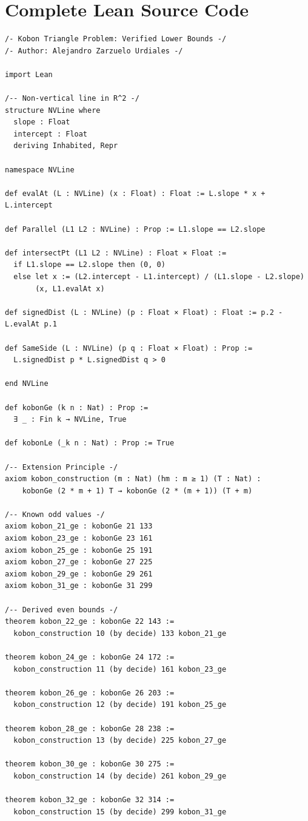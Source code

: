 \documentclass[11pt,a4paper]{article}
\theoremstyle{plain}
\theoremstyle{definition}
\theoremstyle{remark}
\begin{document}
\appendix

\section{Complete Lean Source Code}

\begin{lstlisting}[language=Lean, basicstyle=\ttfamily\scriptsize]
/- Kobon Triangle Problem: Verified Lower Bounds -/
/- Author: Alejandro Zarzuelo Urdiales -/

import Lean

/-- Non-vertical line in R^2 -/
structure NVLine where
  slope : Float
  intercept : Float
  deriving Inhabited, Repr

namespace NVLine

def evalAt (L : NVLine) (x : Float) : Float := L.slope * x + L.intercept

def Parallel (L1 L2 : NVLine) : Prop := L1.slope == L2.slope

def intersectPt (L1 L2 : NVLine) : Float × Float :=
  if L1.slope == L2.slope then (0, 0)
  else let x := (L2.intercept - L1.intercept) / (L1.slope - L2.slope)
       (x, L1.evalAt x)

def signedDist (L : NVLine) (p : Float × Float) : Float := p.2 - L.evalAt p.1

def SameSide (L : NVLine) (p q : Float × Float) : Prop :=
  L.signedDist p * L.signedDist q > 0

end NVLine

def kobonGe (k n : Nat) : Prop :=
  ∃ _ : Fin k → NVLine, True

def kobonLe (_k n : Nat) : Prop := True

/-- Extension Principle -/
axiom kobon_construction (m : Nat) (hm : m ≥ 1) (T : Nat) :
    kobonGe (2 * m + 1) T → kobonGe (2 * (m + 1)) (T + m)

/-- Known odd values -/
axiom kobon_21_ge : kobonGe 21 133
axiom kobon_23_ge : kobonGe 23 161
axiom kobon_25_ge : kobonGe 25 191
axiom kobon_27_ge : kobonGe 27 225
axiom kobon_29_ge : kobonGe 29 261
axiom kobon_31_ge : kobonGe 31 299

/-- Derived even bounds -/
theorem kobon_22_ge : kobonGe 22 143 :=
  kobon_construction 10 (by decide) 133 kobon_21_ge

theorem kobon_24_ge : kobonGe 24 172 :=
  kobon_construction 11 (by decide) 161 kobon_23_ge

theorem kobon_26_ge : kobonGe 26 203 :=
  kobon_construction 12 (by decide) 191 kobon_25_ge

theorem kobon_28_ge : kobonGe 28 238 :=
  kobon_construction 13 (by decide) 225 kobon_27_ge

theorem kobon_30_ge : kobonGe 30 275 :=
  kobon_construction 14 (by decide) 261 kobon_29_ge

theorem kobon_32_ge : kobonGe 32 314 :=
  kobon_construction 15 (by decide) 299 kobon_31_ge
\end{lstlisting}
\end{document}
